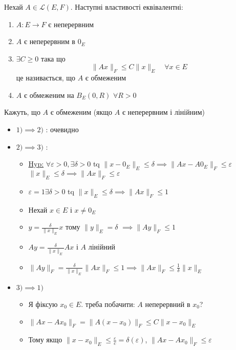 \begin{theorem}
    Нехай $A \in \mathcal{L}(E, F)$. Наступні властивості еквівалентні:
    \begin{enumerate}
        \item $A: E \to F$ є неперервним
        \item $A$ є неперервним в $0_E$
        \item $\exists C \ge 0$ така що 
            \[
            \|Ax\|_F \le C\|x\|_E \quad \forall x \in E
            \] 
            це називається, що $A$ є обмеженим
        \item $A$ є обмеженим на $B_E(0, R)$ $\forall R > 0$
    \end{enumerate}
    Кажуть, що $A$ є обмеженим (якщо $A$ є неперервним і лінійним)
\end{theorem}
\begin{preuve}
    \begin{itemize}
        \item $1) \implies 2)$ : очевидно
        \item $2) \implies 3)$ :

            \begin{itemize}
                \item 
                    \underline{Hyp:} $\forall \varepsilon >0, \exists \delta > 0$ tq $\|x - 0_E\|_E \le \delta \implies \|Ax - A0_E\|_F \le \varepsilon$ $\|x\|_E \le \delta \implies \|Ax\|_F \le \varepsilon$
                \item $\varepsilon = 1 \exists \delta > 0$ tq $\|x\|_E \le \delta \implies \|Ax\|_F \le 1$
                \item Нехай $ x \in E$ і $x \neq 0_E$
                \item $y = \frac{\delta}{\|x\|_E}x$ тому $\|y\|_E = \delta$  $\implies\|Ay\|_F \le 1$
                \item $Ay = \frac{\delta}{\|x\|_{E}}Ax$ і $A$ лінійний
                \item  $\|Ay\|_{F} = \frac{\delta}{\|x\|_E}\|Ax\|_F \le 1 \implies \|Ax\|_F \le \frac{1}{\delta}\|x\|_E$
            \end{itemize}
        \item $3) \implies 1)$ 
            \begin{itemize}
                \item Я фіксую $x_0 \in E$. треба побачити: $A$ неперервний в  $x_0$?
                \item $\|Ax - Ax_0\|_F = \|A(x - x_0)\|_F \le C\|x - x_0\|_E$
                \item Тому якщо $\|x - x_0\|_E \le \frac{\varepsilon}{c} = \delta(\varepsilon)$, $\|Ax - Ax_0\|_F \le \varepsilon$
            \end{itemize}
    \end{itemize}
\end{preuve}

